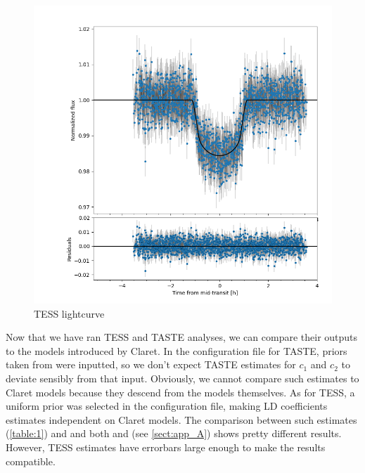 \documentclass[a4paper,11pt,twocolumn]{article}
\begin{document}
\begin{figure}
    \centering
    \includegraphics[scale=0.2, angle=0]{../pictures/tess/lctess.png}
    \caption{TESS lightcurve}
   \label{fig: lc1}
\end{figure}

Now that we have ran TESS and TASTE 
analyses, we can compare their outputs 
to the models introduced by Claret. In the configuration 
file for TASTE, priors taken from 
\cite{claret2011} were inputted, so we don't expect 
TASTE estimates for $c_1$ and $c_2$ to deviate sensibly 
from that input. Obviously, we cannot compare such estimates 
to Claret models because they descend from the models themselves.
As for TESS, a uniform prior was selected in  the configuration 
file, making LD coefficients estimates independent on Claret 
models. The comparison between such estimates (\ref{table:1}) and 
and both \cite{claret2017} and \cite{claret2018} (see \ref{sect:app_A}) 
shows pretty different results. However, TESS estimates have errorbars 
large enough to make the results compatible.
\end{document}
